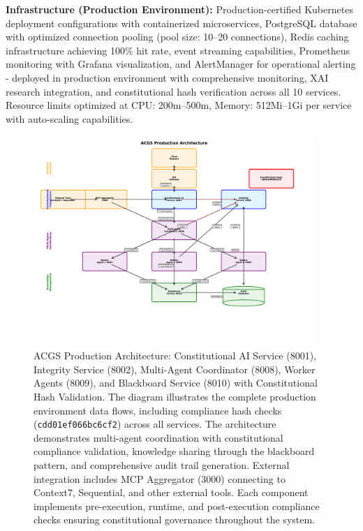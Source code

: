\documentclass[manuscript,screen,9pt]{acmart}
\begin{document}
\textbf{Infrastructure (Production Environment):}
Production-certified Kubernetes deployment configurations with containerized microservices, PostgreSQL database with optimized connection pooling (pool size: 10--20 connections), Redis caching infrastructure achieving 100\% hit rate, event streaming capabilities, Prometheus monitoring with Grafana visualization, and AlertManager for operational alerting - deployed in production environment with comprehensive monitoring, XAI research integration, and constitutional hash verification across all 10 services. Resource limits optimized at CPU: 200m--500m, Memory: 512Mi--1Gi per service with auto-scaling capabilities.
\begin{figure}[!htb]
\centering
\includegraphics[width=0.95\textwidth,keepaspectratio]{figures/production_architecture.pdf}
\caption[ACGS Production Architecture]{ACGS Production Architecture: Constitutional AI Service (8001), Integrity Service (8002), Multi-Agent Coordinator (8008), Worker Agents (8009), and Blackboard Service (8010) with Constitutional Hash Validation. The diagram illustrates the complete production environment data flows, including compliance hash checks (\texttt{\small{cdd01ef066bc6cf2}}) across all services. The architecture demonstrates multi-agent coordination with constitutional compliance validation, knowledge sharing through the blackboard pattern, and comprehensive audit trail generation. External integration includes MCP Aggregator (3000) connecting to Context7, Sequential, and other external tools. Each component implements pre-execution, runtime, and post-execution compliance checks ensuring constitutional governance throughout the system.}
\label{fig:architecture}
\end{figure}
\end{document}
